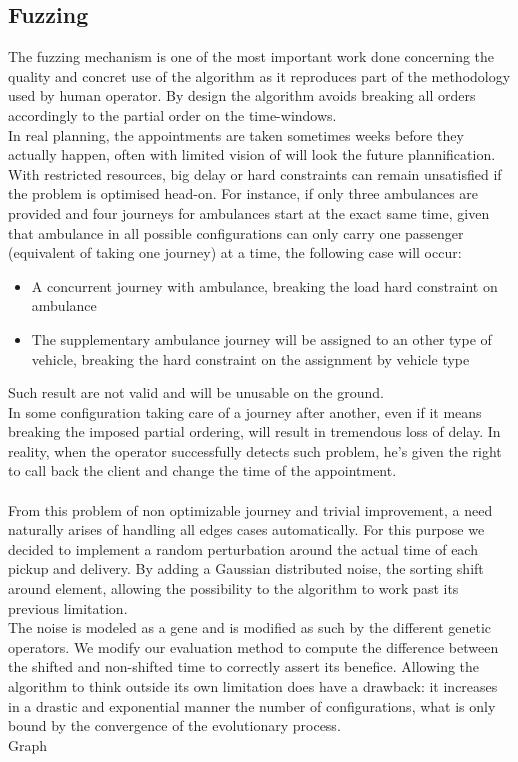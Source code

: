 \documentclass[12pt]{memoir}
\begin{document}
\subsection{Fuzzing}
The fuzzing mechanism is one of the most important work done concerning the quality and concret use
of the algorithm as it reproduces part of the methodology used by human operator. By design the algorithm
avoids breaking all orders accordingly to the partial order on the time-windows.\\
In real planning, the appointments are taken sometimes weeks before they actually
happen, often with limited vision of will look the future plannification. With restricted resources, big delay 
or hard constraints can remain unsatisfied if the problem is optimised head-on. For instance, if only three ambulances 
are provided and four journeys for ambulances start at the exact same time, given that ambulance in all possible configurations can only carry one passenger
 (equivalent of taking one journey) at a time, the following case will occur:
\begin{itemize}
  \item A concurrent journey with ambulance, breaking the load hard constraint on ambulance
  \item The supplementary ambulance journey will be assigned to an other type of vehicle,
        breaking the hard constraint on the assignment by vehicle type
\end{itemize}
Such result are not valid and will be unusable on the ground.\\
In some configuration taking care of a journey after another, even if it means breaking the
imposed partial ordering, will result in tremendous loss of delay. In reality, when the operator
successfully detects such problem, he's given the right to call back the client and change the
time of the appointment. \\
\\
From this problem of non optimizable journey and trivial improvement, a need naturally arises of handling
all edges cases automatically. For this purpose we decided to implement a random perturbation around the
actual time of each pickup and delivery. By adding a Gaussian distributed noise, the sorting shift around
element, allowing the possibility to the algorithm to work past its previous limitation.\\
The noise is modeled as a gene and is modified as such by the different genetic operators.
We modify our evaluation method to compute the difference between the shifted and non-shifted time
to correctly assert its benefice. Allowing the algorithm to think outside its own limitation does
have a drawback: it increases in a drastic and exponential manner the number of configurations,
what is only bound by the convergence of the evolutionary process.\\
Graph
\end{document}
